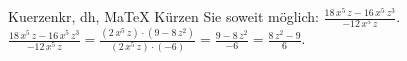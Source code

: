 \begin{MAufgabe}{Kuerzen}{kr, dh, MaTeX}
K\"urzen Sie soweit m\"oglich: $\frac{18\, x^5\, z - 16\, x^5\, z^3}{- 12\, x^5\, z}$.\\ 
\ifLsg\MLoesung
\quad $\frac{18\, x^5\, z - 16\, x^5\, z^3}{- 12\, x^5\, z}=\frac{(2\, x^5\, z)\cdot(9 - 8\, z^2)}{(2\, x^5\, z)\cdot(-6)}=\frac{9 - 8\, z^2}{-6}=\frac{8\, z^2 - 9}{6}$.\else\relax\fi
 \end{MAufgabe}